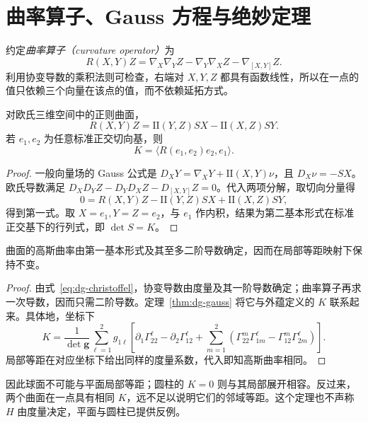 \documentclass[UTF8,12pt,a4paper,fontset=fandol]{ctexbook}
\newcommand{\ip}[2]{\langle #1,#2\rangle}
\begin{document}
\section{曲率算子、Gauss 方程与绝妙定理}
\begin{definition}[曲率算子]
约定\emph{曲率算子（curvature operator）}为
\[
 R(X,Y)Z=\nabla_X\nabla_YZ-\nabla_Y\nabla_XZ-\nabla_{[X,Y]}Z.
\]
利用协变导数的乘积法则可检查，右端对 $X,Y,Z$ 都具有函数线性，所以在一点的值只依赖三个向量在该点的值，而不依赖延拓方式。
\end{definition}

\begin{theorem}[Gauss 方程]
对欧氏三维空间中的正则曲面，
\begin{equation}
 R(X,Y)Z=\mathrm{II}(Y,Z)SX-\mathrm{II}(X,Z)SY.
 \label{eq:dg-gauss-equation}
\end{equation}
若 $e_1,e_2$ 为任意标准正交切向基，则
\begin{equation}
 K=\ip{R(e_1,e_2)e_2}{e_1}.
 \label{eq:dg-intrinsic-K}
\end{equation}
\label{thm:dg-gauss}
\end{theorem}
\begin{proof}
一般向量场的 Gauss 公式是 $D_XY=\nabla_XY+\mathrm{II}(X,Y)\nu$，且 $D_X\nu=-SX$。欧氏导数满足 $D_XD_YZ-D_YD_XZ-D_{[X,Y]}Z=0$。代入两项分解，取切向分量得
\[
 0=R(X,Y)Z-\mathrm{II}(Y,Z)SX+\mathrm{II}(X,Z)SY,
\]
得到第一式。取 $X=e_1,Y=Z=e_2$，与 $e_1$ 作内积，结果为第二基本形式在标准正交基下的行列式，即 $\det S=K$。
\end{proof}

\begin{theorem}
曲面的高斯曲率由第一基本形式及其至多二阶导数确定，因而在局部等距映射下保持不变。
\label{thm:dg-egregium}
\end{theorem}
\begin{proof}
由式~\eqref{eq:dg-christoffel}，协变导数由度量及其一阶导数确定；曲率算子再求一次导数，因而只需二阶导数。定理~\ref{thm:dg-gauss} 将它与外蕴定义的 $K$ 联系起来。具体地，坐标下
\begin{equation}
 K=\frac{1}{\det\mathbf g}\sum_{\ell=1}^2 g_{1\ell}
 \left[\partial_1\Gamma^\ell_{22}-\partial_2\Gamma^\ell_{12}
 +\sum_{m=1}^2\left(\Gamma^m_{22}\Gamma^\ell_{1m}
 -\Gamma^m_{12}\Gamma^\ell_{2m}\right)\right].
 \label{eq:dg-K-christoffel}
\end{equation}
局部等距在对应坐标下给出同样的度量系数，代入即知高斯曲率相同。
\end{proof}
因此球面不可能与平面局部等距；圆柱的 $K=0$ 则与其局部展开相容。反过来，两个曲面在一点具有相同 $K$，远不足以说明它们的邻域等距。这个定理也不声称 $H$ 由度量决定，平面与圆柱已提供反例。
\end{document}
